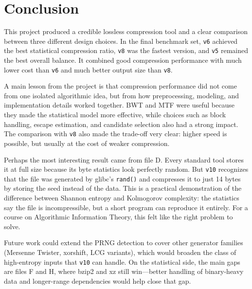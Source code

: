 \section{Conclusion}
\label{sec:conclusion}

This project produced a credible lossless compression tool and a clear comparison between three different design choices. In the final benchmark set, \texttt{v6} achieved the best statistical compression ratio, \texttt{v8} was the fastest version, and \texttt{v5} remained the best overall balance. It combined good compression performance with much lower cost than \texttt{v6} and much better output size than \texttt{v8}.

A main lesson from the project is that compression performance did not come from one isolated algorithmic idea, but from how preprocessing, modeling, and implementation details worked together. BWT and MTF were useful because they made the statistical model more effective, while choices such as block handling, escape estimation, and candidate selection also had a strong impact. The comparison with \texttt{v8} also made the trade-off very clear: higher speed is possible, but usually at the cost of weaker compression.

Perhaps the most interesting result came from file D. Every standard tool stores it at full size because its byte statistics look perfectly random. But \texttt{v10} recognizes that the file was generated by glibc's \texttt{rand()} and compresses it to just 14 bytes by storing the seed instead of the data. This is a practical demonstration of the difference between Shannon entropy and Kolmogorov complexity: the statistics say the file is incompressible, but a short program can reproduce it entirely. For a course on Algorithmic Information Theory, this felt like the right problem to solve.

Future work could extend the PRNG detection to cover other generator families (Mersenne Twister, xorshift, LCG variants), which would broaden the class of high-entropy inputs that \texttt{v10} can handle. On the statistical side, the main gaps are files F and H, where bzip2 and xz still win---better handling of binary-heavy data and longer-range dependencies would help close that gap.
